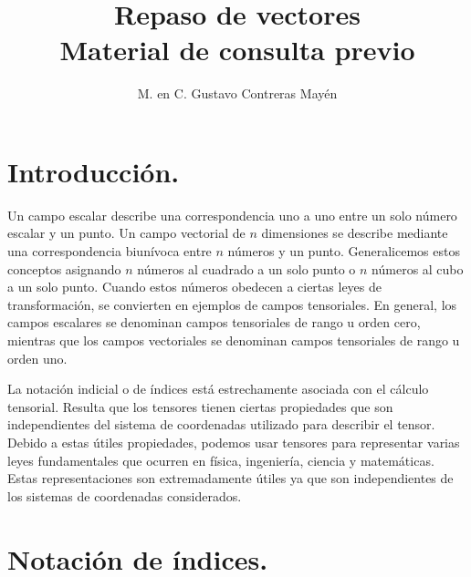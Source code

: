 
\usetikzlibrary{babel}
\setlength{\tabcolsep}{12pt}
\title{Repaso de vectores \\ \large{Material de consulta previo}\vspace{-3ex}}
\author{M. en C. Gustavo Contreras Mayén}
\date{ }

\vspace{-4cm}
\maketitle
\fontsize{14}{14}\selectfont
\tableofcontents
\newpage



\section{Introducción.}

Un campo escalar describe una correspondencia uno a uno entre un solo número escalar y un punto. Un campo vectorial de $n$ dimensiones se describe mediante una correspondencia biunívoca entre $n$ números y un punto. Generalicemos estos conceptos asignando $n$ números al cuadrado a un solo punto o $n$ números al cubo a un solo punto. Cuando estos números obedecen a ciertas leyes de transformación, se convierten en ejemplos de campos tensoriales. En general, los campos escalares se denominan campos tensoriales de rango u orden cero, mientras que los campos vectoriales se denominan campos tensoriales de rango u orden uno.
\par
La notación indicial o de índices está estrechamente asociada con el cálculo tensorial. Resulta que los tensores tienen ciertas propiedades que son independientes del sistema de coordenadas utilizado para describir el tensor. Debido a estas útiles propiedades, podemos usar tensores para representar varias leyes fundamentales que ocurren en física, ingeniería, ciencia y matemáticas. Estas representaciones son extremadamente útiles ya que son independientes de los sistemas de coordenadas considerados.

\section{Notación de índices.}

